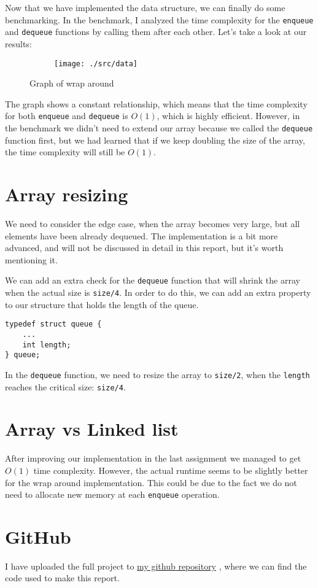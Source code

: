 \documentclass[a4paper,11pt]{article}
\newcommand{\underlinehref}[2]{%
    \href{#1}{\ul{#2}}%
}
\begin{document}
    Now that we have implemented the data structure, we can finally do some benchmarking.
    In the benchmark, I analyzed the time complexity for the {\tt enqueue} and {\tt dequeue} functions by calling them after each other.
    Let's take a look at our results:

    \begin{figure}[H]
        \centering
        \begin{subfigure}[b]{.5\textwidth}
            \centering
            \texttt{[image: ./src/data]} %
        \end{subfigure}
        \caption{Graph of wrap around}
        \label{fig:graph_1}
    \end{figure}

    The graph shows a constant relationship, which means that the time complexity for both {\tt enqueue} and {\tt dequeue} is $O(1)$, which is highly efficient.
    However, in the benchmark we didn't need to extend our array because we called the {\tt dequeue} function first, but we had learned that if we keep doubling the size of the array, the time complexity will still be $O(1)$.

    \section*{Array resizing}

    We need to consider the edge case, when the array becomes very large, but all elements have been already dequeued.
    The implementation is a bit more advanced, and will not be discussed in detail in this report, but it's worth mentioning it.

    We can add an extra check for the {\tt dequeue} function that will shrink the array when the actual size is {\tt size/4}.
    In order to do this, we can add an extra property to our structure that holds the length of the queue.

    \begin{verbatim}
typedef struct queue {
    ...
    int length;
} queue;
    \end{verbatim}

    In the {\tt dequeue} function, we need to resize the array to {\tt size/2}, when the {\tt length} reaches the critical size: {\tt size/4}.

    \section*{Array vs Linked list}

    After improving our implementation in the last assignment we managed to get $O(1)$ time complexity.
    However, the actual runtime seems to be slightly better for the wrap around implementation.
    This could be due to the fact we do not need to allocate new memory at each {\tt enqueue} operation.

    \section*{GitHub}
    I have uploaded the full project to \underlinehref{https://github.com/peterherczku/ID1021/tree/main/assignment-6-D}{my github repository}, where we can find the code used to make this report.
\end{document}
